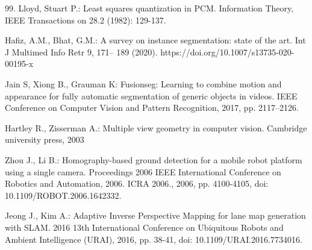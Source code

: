 \begin{thebibliography}{99.}
Lloyd, Stuart P.: Least squares quantization in PCM. Information Theory, IEEE Transactions on 28.2 (1982): 129-137.

Hafiz, A.M., Bhat, G.M.: A survey on instance segmentation: state of the art. Int J Multimed Info Retr 9, 171–
189 (2020). https://doi.org/10.1007/s13735-020-00195-x

Jain S, Xiong B., Grauman K: Fusionseg: Learning to combine motion and appearance for fully automatic segmentation of generic objects in videos. IEEE Conference on Computer Vision and Pattern Recognition, 2017, pp. 2117–2126.



Hartley R., Zisserman A.:
Multiple view geometry in computer vision.
Cambridge university press, 2003

Zhou J., Li B.:
Homography-based ground detection for a mobile robot platform using a single camera.
Proceedings 2006 IEEE International Conference on Robotics and Automation, 2006. ICRA 2006., 2006, pp. 4100-4105, doi: 10.1109/ROBOT.2006.1642332.

Jeong J., Kim A.:
Adaptive Inverse Perspective Mapping for lane map generation with SLAM.
2016 13th International Conference on Ubiquitous Robots and Ambient Intelligence (URAI), 2016, pp. 38-41, doi: 10.1109/URAI.2016.7734016.

%
\end{thebibliography}
